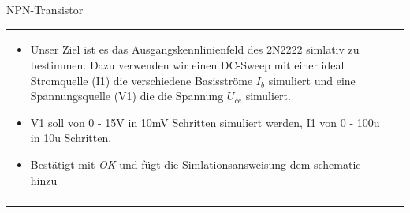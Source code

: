 \begin{frame}[t]{NPN-Transistor}
\begin{spacing}{0.9}
\begin{tiny}
\begin{table}[h!]
\begin{tabular}{p{3cm} p{7cm}}
\begin{minipage}{.7\textwidth}
\begin{itemize}
              \item Unser Ziel ist es das Ausgangskennlinienfeld des 2N2222 simlativ zu bestimmen. Dazu verwenden wir einen DC-Sweep
                    mit einer ideal Stromquelle (I1) die verschiedene Basisströme $I_b$ simuliert und eine Spannungsquelle (V1) die die Spannung
                    $U_{ce}$ simuliert.
              \item V1 soll von 0 - 15V in 10mV Schritten simuliert werden, I1 von 0 - 100u in 10u Schritten.
              \item Bestätigt mit \textit{OK} und fügt die Simlationsansweisung dem schematic hinzu
            \end{itemize}
          \end{minipage}
          \\
                                                & \\
          \hline
        \end{tabular}

      \end{table}

    \end{tiny} \end{spacing}

\end{frame}


